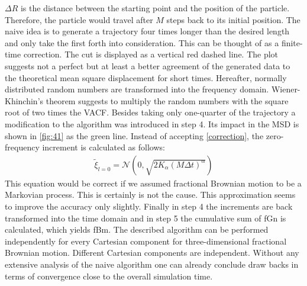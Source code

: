 \documentclass[
  a4paper,BCOR10mm,twoside,
  headsepline,footsepline,%
  fleqn,openbib
]{scrbook}
\begin{document}
$\Delta R $ is the distance between the starting point and the position of the particle. Therefore, the particle would travel after $M$ steps back to its initial position. The naive idea is to generate a trajectory four times longer than the desired length and only take the first forth into consideration. This can be thought of as a finite-time correction. The cut is displayed as a vertical red dashed line. The plot suggests not a perfect but at least a better agreement of the generated data to the theoretical mean square displacement for short times. Hereafter, normally distributed random numbers are transformed into the frequency domain. Wiener-Khinchin's theorem suggests to multiply the random numbers with the square root of two times the VACF. Besides taking only one-quarter of the trajectory a modification to the algorithm was introduced in step 4. Its impact in the MSD is shown in \cref{fig:41} as the green line. Instead of accepting  \cref{correction}, the zero-frequency increment is calculated as follows:
\begin{align}
 \tilde{\xi}_{l=0} = \mathcal{N}(0,\sqrt{2 K_{\alpha} (M \Delta t)^\alpha})
\end{align}
This equation would be correct if we assumed fractional Brownian motion to be a Markovian process. This is certainly is not the cause. This approximation seems to improve the accuracy only slightly.
Finally in step 4 the increments are back transformed into the time domain and in step 5 the cumulative sum of fGn is calculated, which yields fBm. The described algorithm can be performed independently for every Cartesian component for three-dimensional fractional Brownian motion. Different Cartesian components are independent. Without any extensive analysis of the naive algorithm one can already conclude draw backs in terms of convergence close to the overall simulation time. 
\end{document}
